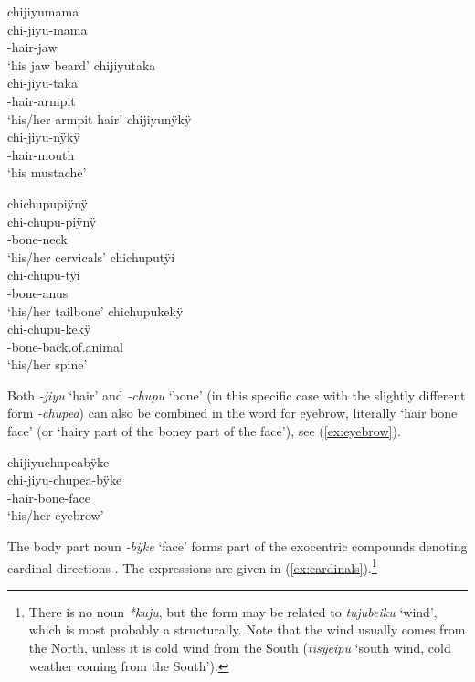 \ea\label{ex:jiyu}
  \ea\label{ex:jiyu.1}
\begingl
\glpreamble chijiyumama\\
\gla chi-jiyu-mama\\
-hair-jaw\\
\glft ‘his jaw beard’
\endgl
  \ex\label{ex:jiyu.2}
\begingl
\glpreamble chijiyutaka\\
\gla chi-jiyu-taka\\
-hair-armpit\\
\glft ‘his/her armpit hair’
\endgl
  \ex\label{ex:jiyu.3}
\begingl
\glpreamble chijiyunÿkÿ\\
\gla chi-jiyu-nÿkÿ\\
-hair-mouth\\
\glft ‘his mustache’
\endgl
\z
\xe

\ea\label{ex:chupu}
  \ea\label{ex:chupu.1}
\begingl
\glpreamble chichupupiÿnÿ\\
\gla chi-chupu-piÿnÿ\\
-bone-neck\\
\glft ‘his/her cervicals’
\endgl
  \ex\label{ex:chupu.2}
\begingl
\glpreamble chichuputÿi\\
\gla chi-chupu-tÿi\\
-bone-anus\\
\glft ‘his/her tailbone’
\endgl
  \ex\label{ex:chupu.3}
\begingl
\glpreamble chichupukekÿ\\
\gla chi-chupu-kekÿ\\
-bone-back.of.animal\\
\glft ‘his/her spine’
\endgl
\z
\xe

Both \textit{-jiyu} ‘hair’ and \textit{-chupu} ‘bone’ (in this specific case with the slightly different form \mbox{\textit{-chupea}}) can also be combined in the word for eyebrow, literally ‘hair bone face’ (or ‘hairy part of the boney part of the face’), see (\ref{ex:eyebrow}).

\ea\label{ex:eyebrow}
\begingl 
\glpreamble chijiyuchupeabÿke\\
\gla chi-jiyu-chupea-bÿke\\ 
-hair-bone-face\\ 
\glft ‘his/her eyebrow’
\xe

The body part noun \textit{-bÿke} ‘face’ forms part of the exocentric compounds denoting cardinal directions \citep[266]{TerhartDanielsenBODY}. The expressions are given in (\ref{ex:cardinals}).\footnote{There is no noun \textit{*kuju}, but the form may be related to \textit{tujubeiku} ‘wind’, which is most probably a  structurally. Note that the wind usually comes from the North, unless it is cold wind from the South (\textit{tisÿeipu} ‘south wind, cold weather coming from the South’).}

